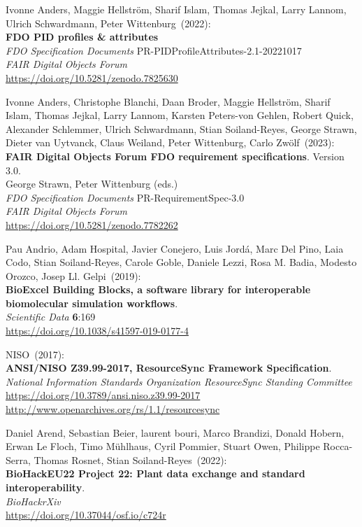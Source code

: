 \begin{thebibliography}{9}
Ivonne Anders, Maggie Hellström, Sharif Islam, Thomas Jejkal, Larry Lannom, Ulrich Schwardmann, Peter Wittenburg~(2022): \\
\textbf{{FDO PID} profiles \& attributes} \\
\emph{FDO Specification Documents} PR-PIDProfileAttributes-2.1-20221017 \\
\emph{FAIR Digital Objects Forum}\\
\url{https://doi.org/10.5281/zenodo.7825630}

Ivonne Anders, Christophe Blanchi, Daan Broder, Maggie Hellström, Sharif Islam, Thomas Jejkal, Larry Lannom, Karsten Peters-von Gehlen, Robert Quick, Alexander Schlemmer, Ulrich Schwardmann, Stian Soiland-Reyes, George Strawn, Dieter van Uytvanck, Claus Weiland, Peter Wittenburg, Carlo Zwölf~(2023): \\
\textbf{{FAIR Digital Objects Forum FDO} requirement specifications}. Version 3.0.\\
George Strawn, Peter Wittenburg (eds.)\\
\emph{FDO Specification Documents} PR-RequirementSpec-3.0\\
\emph{FAIR Digital Objects Forum}\\
\url{https://doi.org/10.5281/zenodo.7782262}

Pau Andrio, Adam Hospital, Javier Conejero, Luis Jordá, Marc Del Pino, Laia Codo, Stian Soiland-Reyes, Carole Goble, Daniele Lezzi, Rosa M. Badia, Modesto Orozco, Josep Ll. Gelpi~(2019): \\
\textbf{BioExcel Building Blocks, a software library for interoperable biomolecular simulation workflows}.\\
\emph{Scientific Data} \textbf{6}:169\\
\url{https://doi.org/10.1038/s41597-019-0177-4}

NISO~(2017): \\
\textbf{ANSI/NISO Z39.99-2017, ResourceSync Framework Specification}.\\
\emph{National Information Standards Organization ResourceSync Standing Committee}\\
\url{https://doi.org/10.3789/ansi.niso.z39.99-2017}\\
\url{http://www.openarchives.org/rs/1.1/resourcesync}

Daniel Arend, Sebastian Beier, laurent bouri, Marco Brandizi, Donald Hobern, Erwan Le Floch, Timo Mühlhaus, Cyril Pommier, Stuart Owen, Philippe Rocca-Serra, Thomas Rosnet, Stian Soiland-Reyes~(2022): \\
\textbf{BioHackEU22 Project 22: Plant data exchange and standard interoperability}.\\
\emph{BioHackrXiv}\\
\url{https://doi.org/10.37044/osf.io/c724r}


\end{thebibliography}
